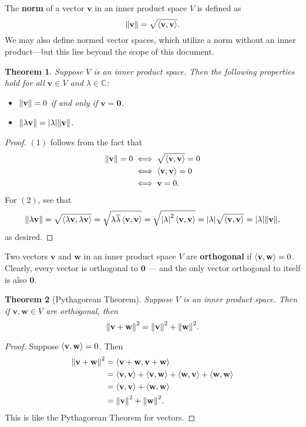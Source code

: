 \documentclass[11pt]{article}
\renewcommand{\vec}[1]{\mathbf{#1}}
\newcommand{\conjugate}[1]{\overline{#1}}
\newtheorem{theorem}{Theorem}
\begin{document}
The \textbf{norm} of a vector $\vec{v}$ in an inner product space $V$ is defined as
\[
	\norm{\vec{v}} = \sqrt{\ev{\vec{v}, \vec{v}}}.
\]
We may also define normed vector spaces, which utilize a norm without an inner product---but this lies beyond the scope of this document.
\begin{adjustwidth}{0.5cm}{}
  \begin{theorem}
	  Suppose $V$ is an inner product space. Then the following properties hold for all $\vec{v} \in V$ and $\lambda \in \mathbb{C}$:
	  \begin{itemize}
		  \item $\norm{\vec{v}} = 0$ if and only if $\vec{v} = \vec{0}$.
		  \item $\norm{\lambda \vec{v}} = \abs{\lambda} \norm{\vec{v}}$.
	  \end{itemize}
  \end{theorem}
	\begin{proof}
		$(1)$ follows from the fact that
		\begin{align*}
			\norm{\vec{v}} = 0 &\iff \sqrt{\ev{\vec{v}, \vec{v}}} = 0 \\
			&\iff \ev{\vec{v}, \vec{v}} = 0 \\
			&\iff \vec{v} = 0.
		\end{align*}
		For $(2)$, see that
		\[
			\norm{\lambda \vec{v}} = \sqrt{\ev{\lambda \vec{v}, \lambda \vec{v}}} = \sqrt{\lambda \conjugate{\lambda} \ev{\vec{v}, \vec{v}}} = \sqrt{\abs{\lambda}^{2} \ev{\vec{v}, \vec{v}}} = \abs{\lambda} \sqrt{\ev{\vec{v}, \vec{v}}} = \abs{\lambda} \norm{\vec{v}},
		\]
		as desired.
	\end{proof}
\end{adjustwidth}

Two vectors $\vec{v}$ and $\vec{w}$ in an inner product space $V$ are \textbf{orthogonal} if $\ev{\vec{v}, \vec{w}} = 0$. Clearly, every vector is orthogonal to $\vec{0}$ --- and the only vector orthogonal to itself is also $\vec{0}$.

\begin{adjustwidth}{0.5cm}{}
  \begin{theorem}[Pythagorean Theorem]
	  Suppose $V$ is an inner product space. Then if $\vec{v}, \vec{w} \in V$ are orthogonal, then
	  \[
		  \norm{\vec{v} + \vec{w}}^{2} = \norm{\vec{v}}^{2} + \norm{\vec{w}}^{2}.
	  \]
  \end{theorem}
	\begin{proof}
		Suppose $\ev{\vec{v}, \vec{w}} = 0$. Then
		\begin{align*}
			\norm{\vec{v} + \vec{w}}^{2} &= \ev{\vec{v} + \vec{w}, \vec{v} + \vec{w}} \\
			&= \ev{\vec{v}, \vec{v}} + \ev{\vec{v}, \vec{w}} + \ev{\vec{w}, \vec{v}} + \ev{\vec{w}, \vec{w}} \\
			&= \ev{\vec{v}, \vec{v}} + \ev{\vec{w}, \vec{w}} \\
			&= \norm{\vec{v}}^{2} + \norm{\vec{w}}^{2}.
		\end{align*}
		This is like the Pythagorean Theorem for vectors.
	\end{proof}
\end{adjustwidth}
\end{document}
